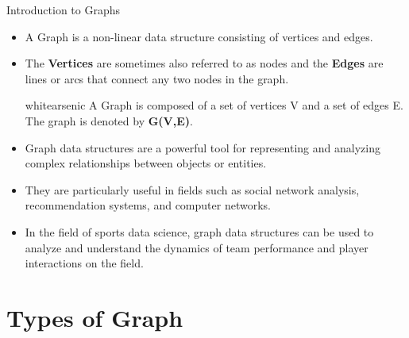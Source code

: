 \documentclass[13pt]{beamer}
\begin{document}
	\begin{frame}[t,allowframebreaks]{Introduction to Graphs}

		\begin{itemize}
			\item  A Graph is a non-linear data structure consisting of vertices and edges.
			\item The \textbf{Vertices} are sometimes also referred to as nodes and the \textbf{Edges} are lines or arcs that connect any two nodes in the graph.

			\begin{bee}{white}{arsenic}
				A Graph is composed of a set of vertices V and a set of edges E. \\
				The graph is denoted by \textbf{G(V,E)}.
			\end{bee}

			\item Graph data structures are a powerful tool for representing and analyzing complex relationships between objects or entities.
			\item They are particularly useful in fields such as social network analysis, recommendation systems, and computer networks.
			\item In the field of sports data science, graph data structures can be used to analyze and understand the dynamics of team performance and player interactions on the field.

		\end{itemize}

	\end{frame}


	\section{Types of Graph}

\end{document}
